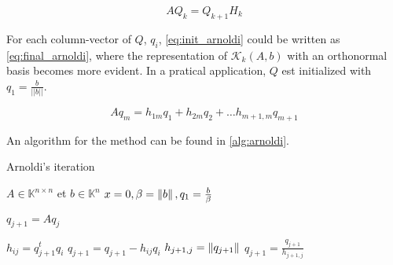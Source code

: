     \begin{equation} \label{eq:init_arnoldi}
        AQ_{k} = Q_{k+1}H_{k}
    \end{equation} 

    For each column-vector of $Q$, $q_{i}$, \ref{eq:init_arnoldi} could be written as \ref{eq:final_arnoldi}, where the representation of $\mathcal{K}_{k}(A,b)$ with an orthonormal basis becomes more evident. In a pratical application, $Q$ est initialized with $q_{1} = \frac{b}{||b||}$.

    \begin{equation}\label{eq:final_arnoldi}
        Aq_{m} = h_{1m}q_{1} + h_{2m}q_{2} + \dots h_{m+1,m}q_{m+1}
    \end{equation}

    An algorithm for the method can be found in \ref{alg:arnoldi}.

     \begin{algorithm}
    \caption{Arnoldi's iteration}\label{alg:arnoldi}
    \begin{algorithmic}[1]
    \State $A \in \mathbb{K}^{n \times n}$ et $b\in \mathbb{K}^{n}$
    \State $x=0, \beta=\left\lVert b\right\rVert,q_{1}=\frac{b}{\beta}$
    
    \State $q_{j+1} = Aq_{j}$

    \State $h_{ij}= q_{j+1}^{t}q_{i}$
    \State $q_{j+1} = q_{j+1} - h_{ij}q_{i}$
    \EndFor
    \State $h_{j+1,j}=\left\lVert q_{j+1}\right\rVert$
    \State $q_{j+1} = \frac{q_{j+1}}{h_{j+1,j}}$
    \EndFor
    
    \end{algorithmic}
    \end{algorithm}